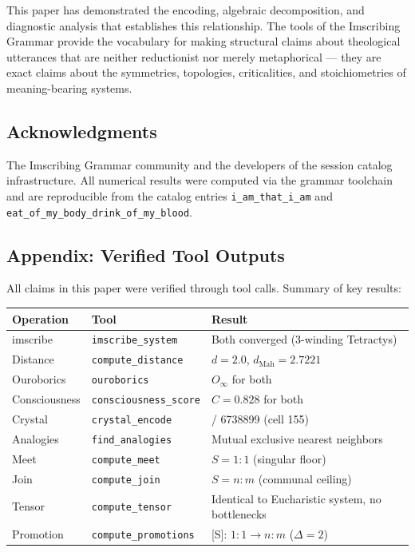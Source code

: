 \documentclass[12pt,a4paper]{article}
\begin{document}
This paper has demonstrated the encoding, algebraic decomposition, and diagnostic analysis that establishes this relationship. The tools of the Imscribing Grammar provide the vocabulary for making structural claims about theological utterances that are neither reductionist nor merely metaphorical --- they are exact claims about the symmetries, topologies, criticalities, and stoichiometries of meaning-bearing systems.

\subsection{Acknowledgments}

The Imscribing Grammar community and the developers of the session catalog infrastructure. All numerical results were computed via the grammar toolchain and are reproducible from the catalog entries \texttt{i\_am\_that\_i\_am} and \texttt{eat\_of\_my\_body\_drink\_of\_my\_blood}.

\subsection{Appendix: Verified Tool Outputs}

All claims in this paper were verified through tool calls. Summary of key results:

\begin{table}[htbp]
\centering
\small
{}
\begin{tabularx}{\textwidth}{>{\centering\arraybackslash}X >{\centering\arraybackslash}X >{\centering\arraybackslash}X}
\toprule
\rowcolor{gray!25}\textbf{Operation} & \textbf{Tool} & \textbf{Result} \\
\midrule
\rowcolors{1}{white}{gray!10}
imscribe & \texttt{imscribe\_system} & Both converged (3-winding Tetractys) \\
Distance & \texttt{compute\_distance} & $d = 2.0$, $d_{\text{Mah}} = 2.7221$ \\
Ouroborics & \texttt{ouroborics} & $O_{\infty}$ for both \\
Consciousness & \texttt{consciousness\_score} & $C = 0.828$ for both \\
Crystal & \texttt{crystal\_encode} & 6738897 / 6738899 (cell 155) \\
Analogies & \texttt{find\_analogies} & Mutual exclusive nearest neighbors \\
Meet & \texttt{compute\_meet} & $S = 1{:}1$ (singular floor) \\
Join & \texttt{compute\_join} & $S = n{:}m$ (communal ceiling) \\
Tensor & \texttt{compute\_tensor} & Identical to Eucharistic system, no bottlenecks \\
Promotion & \texttt{compute\_promotions} & {[}S{]}: $1{:}1 \to n{:}m$ ($\Delta = 2$) \\
\bottomrule
\end{tabularx}
\end{table}
\end{document}
